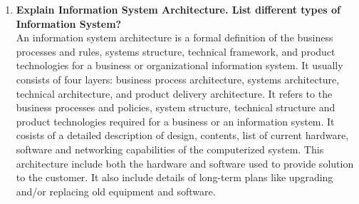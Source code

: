 \documentclass[12pt]{article}
\begin{document}
\begin{enumerate}
    \item {\bfseries Explain Information System Architecture. List different types of Information System?\\}
    An information system architecture is a formal definition of the business processes and rules, systems structure, technical framework, and product technologies for a business or organizational information system. It usually consists of four layers: business process architecture, systems architecture, technical architecture, and product delivery architecture.
    It refers to the business processes and policies, system structure, technical structure and product technologies required for a business or an information system. It cosists of a detailed description of design, contents, list of current hardware, software and networking capabilities of the computerized system. This architecture include both the hardware and software used to provide solution to the customer. It also include details of long-term plans like upgrading and/or replacing old equipment and software.
    

\end{enumerate}
\end{document}
